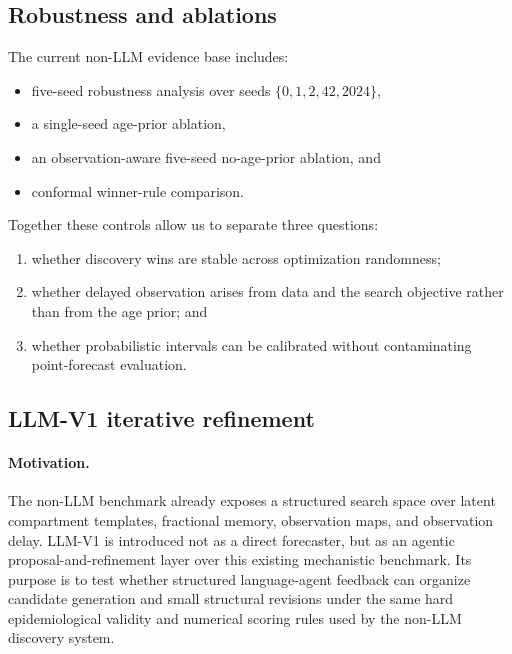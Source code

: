 \subsection{Robustness and ablations}

The current non-LLM evidence base includes:
\begin{itemize}[leftmargin=1.5em]
\item five-seed robustness analysis over seeds
$\{0,1,2,42,2024\}$,
\item a single-seed age-prior ablation,
\item an observation-aware five-seed no-age-prior ablation, and
\item conformal winner-rule comparison.
\end{itemize}

Together these controls allow us to separate three questions:
\begin{enumerate}[leftmargin=1.5em]
\item whether discovery wins are stable across optimization randomness;
\item whether delayed observation arises from data and the search objective
rather than from the age prior; and
\item whether probabilistic intervals can be calibrated without contaminating
point-forecast evaluation.
\end{enumerate}

\subsection{LLM-V1 iterative refinement}

\paragraph{Motivation.}
The non-LLM benchmark already exposes a structured search space over latent
compartment templates, fractional memory, observation maps, and observation
delay. LLM-V1 is introduced not as a direct forecaster, but as an agentic
proposal-and-refinement layer over this existing mechanistic benchmark. Its
purpose is to test whether structured language-agent feedback can organize
candidate generation and small structural revisions under the same hard
epidemiological validity and numerical scoring rules used by the non-LLM
discovery system.

